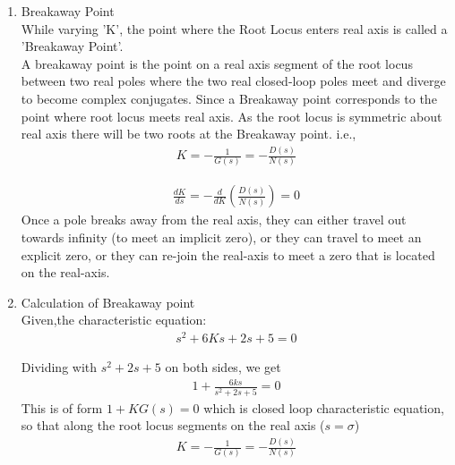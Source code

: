 \begin{enumerate}[label=\thesection.\arabic*.,ref=\thesection.\theenumi]
    
    

\item Breakaway Point \\
    While varying 'K', the point where the Root Locus enters real axis is called a 'Breakaway Point'. \\
A breakaway point is the point on a real axis segment of the root locus between two real poles where the two real closed-loop poles meet and diverge to become complex conjugates. Since a Breakaway point corresponds to the point where root locus meets real axis. As the root locus is symmetric about real axis there will be two roots at the Breakaway point. 
i.e.,
    \begin{align}
        K=-\frac{1}{G(s)}=-\frac{D(s)}{N(s)}    
    \end{align}

    \begin{align}
        \frac{d K}{d s}=-\frac{d}{d K}\left(\frac{D(s)}{N(s)}\right)=0 
    \end{align}
    Once a pole breaks away from the real axis, they can either travel out towards infinity (to meet an implicit zero), or they can travel to meet an explicit zero, or they can re-join the real-axis to meet a zero that is located on the real-axis. 

\item Calculation of Breakaway point \\

Given,the characteristic equation:
    \begin{align}
        s^2 + 6Ks + 2s + 5 = 0    
    \end{align}
    
    Dividing with $s^2 + 2s + 5$ on both sides, we get
    \begin{align}
        1+\frac{6 k s}{s^{2}+2 s+5}=0    
    \end{align}
    This is of form $1+KG(s)=0$ which is closed loop characteristic equation, so that along the root locus
    segments on the real axis ($s = \sigma$)
    \begin{align}
        K=-\frac{1}{G(s)}=-\frac{D(s)}{N(s)}    
    \end{align}


\end{enumerate}
